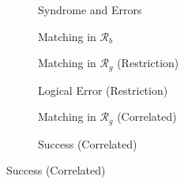 \begin{figure}[hbt!]
    \centering
    \begin{subfigure}[b]{0.32\textwidth}
        \centering
        \resizebox{\linewidth}{!}{
            
        }
        \caption{Syndrome and Errors}
        \label{subfig:corr_a}
    \end{subfigure}
    \hfill
    \begin{subfigure}[b]{0.32\textwidth}
        \centering
        \resizebox{\linewidth}{!}{
            
        }
        \caption{Matching in $\mathcal{R}_b$}
        \label{subfig:corr_b}
    \end{subfigure}
    \hfill
    \begin{subfigure}[b]{0.32\textwidth}
        \centering
        \resizebox{\linewidth}{!}{
            
        }
        \caption{Matching in $\mathcal{R}_g$ (Restriction)}
        \label{subfig:corr_c}
    \end{subfigure}

    \vspace{0.5cm}
    \begin{subfigure}[b]{0.32\textwidth}
        \centering
        \resizebox{\linewidth}{!}{
            
        }
        \caption{Logical Error (Restriction)}
        \label{subfig:corr_d}
    \end{subfigure}
    \hfill
    \begin{subfigure}[b]{0.32\textwidth}
        \centering
        \resizebox{\linewidth}{!}{
            
        }
        \caption{Matching in $\mathcal{R}_g$ (Correlated)}
        \label{subfig:corr_g}
    \end{subfigure}
    \hfill
    \begin{subfigure}[b]{0.32\textwidth}
        \centering
        \resizebox{\linewidth}{!}{
            
        }
        \caption{Success (Correlated)}
        \label{subfig:corr_h}
    \end{subfigure}


\end{figure}
